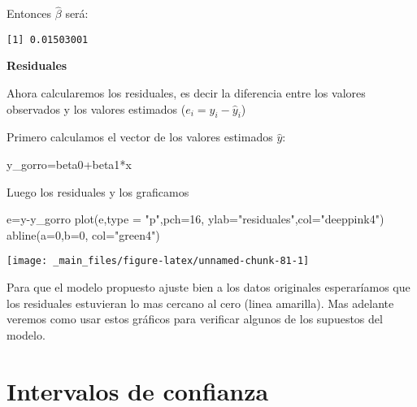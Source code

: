 \documentclass[
  a4paper,
  oneside,
  openany]{book}
\newenvironment{Shaded}{\begin{snugshade}}{\end{snugshade}}
\newcommand{\AttributeTok}[1]{\textcolor[rgb]{0.77,0.63,0.00}{#1}}
\newcommand{\DecValTok}[1]{\textcolor[rgb]{0.00,0.00,0.81}{#1}}
\newcommand{\FunctionTok}[1]{\textcolor[rgb]{0.00,0.00,0.00}{#1}}
\newcommand{\NormalTok}[1]{#1}
\newcommand{\OtherTok}[1]{\textcolor[rgb]{0.56,0.35,0.01}{#1}}
\newcommand{\SpecialCharTok}[1]{\textcolor[rgb]{0.00,0.00,0.00}{#1}}
\newcommand{\StringTok}[1]{\textcolor[rgb]{0.31,0.60,0.02}{#1}}
\begin{document}
Entonces \(\hat{\beta}\) será:

\begin{verbatim}
[1] 0.01503001
\end{verbatim}

\textbf{Residuales}

Ahora calcularemos los residuales, es decir la diferencia entre los valores observados y los valores estimados (\(e_i = y_i-\hat{y}_i\))

Primero calculamos el vector de los valores estimados \(\hat{y}\):

\begin{Shaded}
\begin{Highlighting}[]
\NormalTok{y\_gorro}\OtherTok{=}\NormalTok{beta0}\SpecialCharTok{+}\NormalTok{beta1}\SpecialCharTok{*}\NormalTok{x}
\end{Highlighting}
\end{Shaded}

Luego los residuales y los graficamos

\begin{Shaded}
\begin{Highlighting}[]
\NormalTok{e}\OtherTok{=}\NormalTok{y}\SpecialCharTok{{-}}\NormalTok{y\_gorro }
\FunctionTok{plot}\NormalTok{(e,}\AttributeTok{type =} \StringTok{"p"}\NormalTok{,}\AttributeTok{pch=}\DecValTok{16}\NormalTok{, }\AttributeTok{ylab=}\StringTok{"residuales"}\NormalTok{,}\AttributeTok{col=}\StringTok{"deeppink4"}\NormalTok{) }
\FunctionTok{abline}\NormalTok{(}\AttributeTok{a=}\DecValTok{0}\NormalTok{,}\AttributeTok{b=}\DecValTok{0}\NormalTok{, }\AttributeTok{col=}\StringTok{"green4"}\NormalTok{)}
\end{Highlighting}
\end{Shaded}

\begin{center}\texttt{[image: \_main\_files/figure-latex/unnamed-chunk-81-1]} \end{center}

Para que el modelo propuesto ajuste bien a los datos originales esperaríamos que los residuales estuvieran lo mas cercano al cero (linea amarilla). Mas adelante veremos como usar estos gráficos para verificar algunos de los supuestos del modelo.

\hypertarget{intervalos-de-confianza-1}{%
\chapter{Intervalos de confianza}\label{intervalos-de-confianza-1}}
\end{document}
